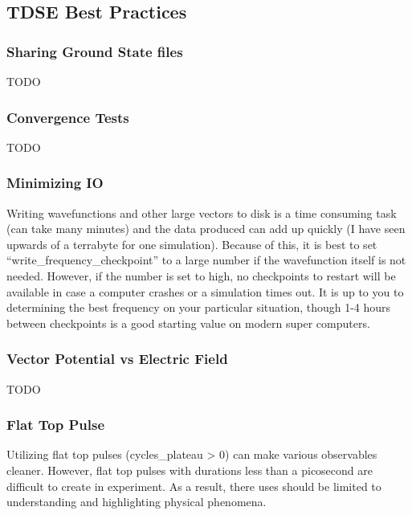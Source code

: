 \documentclass{article}
\begin{document}

\subsection{TDSE Best Practices} %
\label{sub:tdse_best_practices}

\subsubsection{Sharing Ground State files} %
\label{ssub:sharing_ground_state_files}
TODO

\subsubsection{Convergence Tests} %
\label{ssub:convergence_tests}
TODO

\subsubsection{Minimizing IO} %
\label{ssub:minimizing_io}
Writing wavefunctions and other large vectors to disk is a time consuming task (can take many minutes) and the data produced can add up quickly (I have seen upwards of a terrabyte for one simulation). Because of this, it is best to set ``write\_frequency\_checkpoint'' to a large number if the wavefunction itself is not needed. However, if the number is set to high, no checkpoints to restart will be available in case a computer crashes or a simulation times out. It is up to you to determining the best frequency on your particular situation, though 1-4 hours between checkpoints is a good starting value on modern super computers.

\subsubsection{Vector Potential vs Electric Field} %
\label{ssub:vector_potential_vs_electric_field}
TODO

\subsubsection{Flat Top Pulse} %
\label{ssub:flat_top_pulse}
Utilizing flat top pulses (cycles\_plateau > 0) can make various observables cleaner. However, flat top pulses with durations less than a picosecond are difficult to create in experiment. As a result, there uses should be limited to understanding and highlighting physical phenomena.
\end{document}

